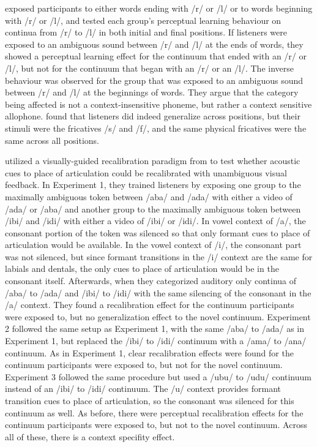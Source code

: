 \citet{Mitterer2013} exposed participants to either words ending with /r/ or /l/ or to words beginning with /r/ or /l/, and tested each group's perceptual learning behaviour on continua from /r/ to /l/ in both initial and final positions.  
If listeners were exposed to an ambiguous sound between /r/ and /l/ at the ends of words, they showed a perceptual learning effect for the continuum that ended with an /r/ or /l/, but not for the continuum that began with an /r/ or an /l/.  
The inverse behaviour was observed for the group that was exposed to an ambiguous sound between /r/ and /l/ at the beginnings of words.  
They argue that the category being affected is not a context-insensitive phoneme, but rather a context sensitive allophone.  
\citet{Jesse2011} found that listeners did indeed generalize across positions, but their stimuli were the fricatives /s/ and /f/, and the same physical fricatives were the same across all positions.


\citet{Reinisch2014} utilized a visually-guided recalibration paradigm from \citet{Bertelson2003} to test whether acoustic cues to place of articulation could be recalibrated with unambiguous visual feedback.  
In Experiment 1, they trained listeners by exposing one group to the maximally ambiguous token between /aba/ and /ada/ with either a video of /ada/ or /aba/ and another group to the maximally ambiguous token between /ibi/ and /idi/ with either a video of /ibi/ or /idi/.  
In vowel context of /a/, the consonant portion of the token was silenced so that only formant cues to place of articulation would be available.  
In the vowel context of /i/, the consonant part was not silenced, but since formant transitions in the /i/ context are the same for labials and dentals, the only cues to place of articulation would be in the consonant itself.  
Afterwards, when they categorized auditory only continua of /aba/ to /ada/ and /ibi/ to /idi/ with the same silencing of the consonant in the /a/ context.  They found a recalibration effect for the continuum participants were exposed to, but no generalization effect to the novel continuum.  
Experiment 2 followed the same setup as Experiment 1, with the same /aba/ to /ada/ as in Experiment 1, but replaced the /ibi/ to /idi/ continuum with a /ama/ to /ana/ continuum.  
As in Experiment 1, clear recalibration effects were found for the continuum participants were exposed to, but not for the novel continuum.  
Experiment 3 followed the same procedure but used a /ubu/ to /udu/ continuum instead of an /ibi/ to /idi/ continuum.  
The /u/ context provides formant transition cues to place of articulation, so the consonant was silenced for this continuum as well.  
As before, there were perceptual recalibration effects for the continuum participants were exposed to, but not to the novel continuum.  
Across all of these, there is a context specifity effect. 

